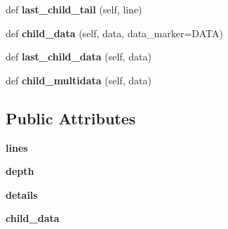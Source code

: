 \begin{DoxyCompactItemize}
def {\bfseries last\+\_\+child\+\_\+tail} (self, line)
\item 
\mbox{\label{classgevent_1_1util_1_1___tree_formatter_a5174c4077d38de83157bac2637d6e2f9}} 
def {\bfseries child\+\_\+data} (self, data, data\+\_\+marker=D\+A\+TA)
\item 
\mbox{\label{classgevent_1_1util_1_1___tree_formatter_a3392c09577d71452db55a9725d8499b2}} 
def {\bfseries last\+\_\+child\+\_\+data} (self, data)
\item 
\mbox{\label{classgevent_1_1util_1_1___tree_formatter_a51d5f027b3f1d206f294a1f6ad9aef70}} 
def {\bfseries child\+\_\+multidata} (self, data)
\end{DoxyCompactItemize}
\subsection*{Public Attributes}
\begin{DoxyCompactItemize}
\item 
\mbox{\label{classgevent_1_1util_1_1___tree_formatter_a962e49594b1f2e502b019bbee2722065}} 
{\bfseries lines}
\item 
\mbox{\label{classgevent_1_1util_1_1___tree_formatter_ae26927010695ec852a3260173285727c}} 
{\bfseries depth}
\item 
\mbox{\label{classgevent_1_1util_1_1___tree_formatter_aa9f7c4741b3d7218f18043e2c72a4d1f}} 
{\bfseries details}
\item 
\mbox{\label{classgevent_1_1util_1_1___tree_formatter_aabafab58f5aa1025be3d400640f6b23a}} 
{\bfseries child\+\_\+data}
\end{DoxyCompactItemize}
